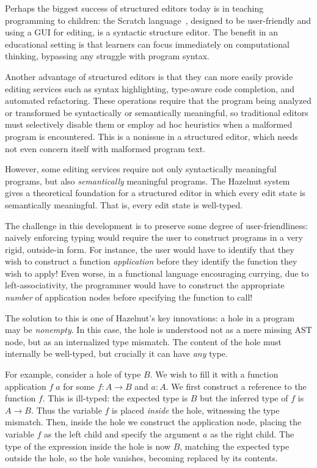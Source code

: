 Perhaps the biggest success of structured editors today is in teaching
programming to children: the Scratch language~\cite{scratch}, designed to be
user-friendly and using a GUI for editing, is a syntactic structure editor.
The benefit in an educational setting is that learners can focus immediately on
computational thinking, bypassing any struggle with program syntax.

Another advantage of structured editors is that they can more easily provide
editing services such as syntax highlighting, type-aware code completion, and
automated refactoring.
These operations require that the program being analyzed or transformed be
syntactically or semantically meaningful, so traditional editors must
selectively disable them or employ ad hoc heuristics when a malformed program is
encountered.
This is a nonissue in a structured editor, which needs not even concern itself
with malformed program text.

However, some editing services require not only syntactically meaningful
programs, but also \emph{semantically} meaningful programs.
The Hazelnut system~\cite{hazelnut} gives a theoretical foundation for a
structured editor in which every edit state is semantically meaningful.
That is, every edit state is well-typed.

The challenge in this development is to preserve some degree of
user-friendliness: naively enforcing typing would require the user to construct
programs in a very rigid, outside-in form.
For instance, the user would have to identify that they wish to construct a
function \emph{application} before they identify the function they wish to apply!
Even worse, in a functional language encouraging currying, due to
left-associativity, the programmer would have to construct the appropriate
\emph{number} of application nodes before specifying the function to call!

The solution to this is one of Hazelnut's key innovations:
a hole in a program may be \emph{nonempty}.
In this case, the hole is understood not as a mere missing AST node, but as an
internalized type mismatch.
The content of the hole must internally be well-typed, but crucially it can have
\emph{any} type.

For example, consider a hole of type $B$. We wish to fill it with a function
application $f\;a$ for some $f : A \to B$ and $a : A$.
We first construct a reference to the function $f$.
This is ill-typed: the expected type is $B$ but the inferred type of $f$ is $A
\to B$.
Thus the variable $f$ is placed \emph{inside} the hole, witnessing the type
mismatch.
Then, inside the hole we construct the application node, placing the variable
$f$ as the left child and specify the argument $a$ as the right child.
The type of the expression inside the hole is now $B$, matching the expected
type outside the hole, so the hole vanishes, becoming replaced by its contents.

